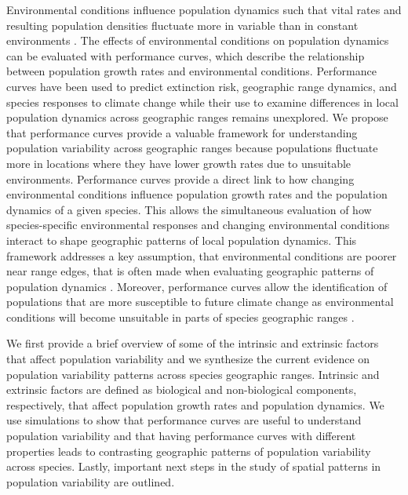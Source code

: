 Environmental conditions influence population dynamics such that vital rates and resulting population densities fluctuate more in variable than in constant environments \parencite{lundberg2000, tuljapurkar2009}. The effects of environmental conditions on population dynamics can be evaluated with performance curves, which describe the relationship between population growth rates and environmental conditions. Performance curves have been used to predict extinction risk, geographic range dynamics, and species responses to climate change \parencite{sinclair2016, huey2012, angilletta2009, buckley2008} while their use to examine differences in local population dynamics across geographic ranges remains unexplored. We propose that performance curves provide a valuable framework for understanding population variability across geographic ranges because populations fluctuate more in locations where they have lower growth rates due to unsuitable environments. Performance curves provide a direct link to how changing environmental conditions influence population growth rates and the population dynamics of a given species. This allows the simultaneous evaluation of how species-specific environmental responses and changing environmental conditions interact to shape geographic patterns of local population dynamics. This framework addresses a key assumption, that environmental conditions are poorer near range edges, that is often made when evaluating geographic patterns of population dynamics \parencite{sagarin2002,pironon2017}. Moreover, performance curves allow the identification of populations that are more susceptible to future climate change as environmental conditions will become unsuitable in parts of species geographic ranges \parencite{buckley2008, kingsolver2017}. 

We first provide a brief overview of some of the intrinsic and extrinsic factors that affect population variability and we synthesize the current evidence on population variability patterns across species geographic ranges. Intrinsic and extrinsic factors are defined as biological and non-biological components, respectively, that affect population growth rates and population dynamics. We use simulations to show that performance curves are useful to understand population variability and that having performance curves with different properties leads to contrasting geographic patterns of population variability across species. Lastly, important next steps in the study of spatial patterns in population variability are outlined. 
  
